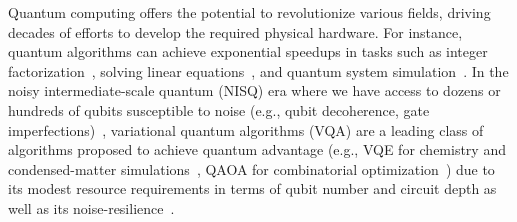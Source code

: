 \documentclass[conference,9pt]{IEEEtran}
\newcommand{\note}[1]{{\color{blue} #1}}
\newcommand{\JC}[1]{{\color{red} [JC: #1]}}
\begin{document}
    Quantum computing offers the potential to revolutionize various fields, driving decades of efforts to develop the required physical hardware. For instance, quantum algorithms can achieve exponential speedups in tasks such as integer factorization~\cite{shor1994algorithms}, solving linear equations~\cite{harrow2009quantum}, and quantum system simulation~\cite{lloyd1996universal}. In the noisy intermediate-scale quantum (NISQ) era where we have access to dozens or hundreds of qubits susceptible to noise (e.g., qubit decoherence, gate imperfections)~\cite{preskill2018quantum}, variational quantum algorithms (VQA) are a leading class of algorithms proposed to achieve quantum advantage (e.g., VQE for chemistry and condensed-matter simulations~\cite{peruzzo2014variational}, QAOA for combinatorial optimization~\cite{farhi2014quantum}) due to its modest resource requirements in terms of qubit number and circuit depth as well as its noise-resilience~\cite{cerezo2021variational}.


\end{document}
